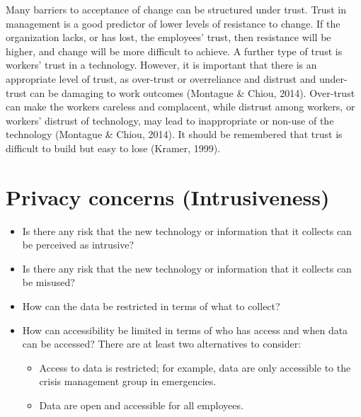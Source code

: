 \documentclass[
  12pt,
]{scrbook}
\begin{document}
Many barriers to acceptance of change can be structured under trust. Trust in management is a good predictor of lower levels of resistance to change. If the organization lacks, or has lost, the employees' trust, then resistance will be higher, and change will be more difficult to achieve. A further type of trust is workers' trust in a technology. However, it is important that there is an appropriate level of trust, as over-trust or overreliance and distrust and under-trust can be damaging to work outcomes (Montague \& Chiou, 2014). Over-trust can make the workers careless and complacent, while distrust among workers, or workers' distrust of technology, may lead to inappropriate or non-use of the technology (Montague \& Chiou, 2014). It should be remembered that trust is difficult to build but easy to lose (Kramer, 1999).~

\hypertarget{privacy-concerns-intrusiveness}{%
\section*{Privacy concerns (Intrusiveness)}\label{privacy-concerns-intrusiveness}}

\begin{itemize}
\item
  Is there any risk that the new technology or information that it collects can be perceived as intrusive?
\item
  Is there any risk that the new technology or information that it collects can be misused?
\item
  How can the data be restricted in terms of what to collect?
\item
  How can accessibility be limited in terms of who has access and when data can be accessed? There are at least two alternatives to consider:

  \begin{itemize}
  \item
    Access to data is restricted; for example, data are only accessible to the crisis management group in emergencies.
  \item
    Data are open and accessible for all employees.~
  \end{itemize}
\end{itemize}
\end{document}
